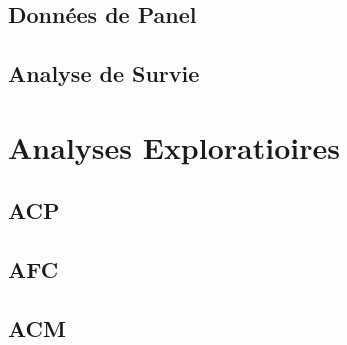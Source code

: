 \documentclass[
]{book}
\begin{document}
\hypertarget{donnuxe9es-de-panel}{%
\section{Données de Panel}\label{donnuxe9es-de-panel}}

\hypertarget{analyse-de-survie}{%
\section{Analyse de Survie}\label{analyse-de-survie}}

\hypertarget{analyses-exploratioires}{%
\chapter{Analyses Exploratioires}\label{analyses-exploratioires}}

\hypertarget{acp}{%
\section{ACP}\label{acp}}

\hypertarget{afc}{%
\section{AFC}\label{afc}}

\hypertarget{acm}{%
\section{ACM}\label{acm}}

  
\end{document}
